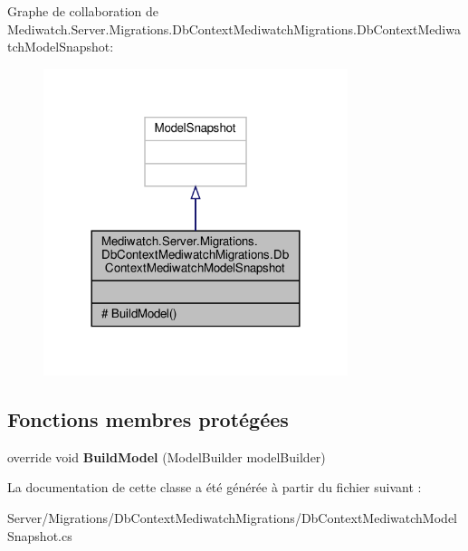 Graphe de collaboration de Mediwatch.\+Server.\+Migrations.\+Db\+Context\+Mediwatch\+Migrations.\+Db\+Context\+Mediwatch\+Model\+Snapshot\+:\nopagebreak
\begin{figure}[H]
\begin{center}
\leavevmode
\includegraphics[width=252pt]{class_mediwatch_1_1_server_1_1_migrations_1_1_db_context_mediwatch_migrations_1_1_db_context_med877236defc748ac970f0d300226712b8}
\end{center}
\end{figure}
\subsection*{Fonctions membres protégées}
\begin{DoxyCompactItemize}
\item 
\mbox{\label{class_mediwatch_1_1_server_1_1_migrations_1_1_db_context_mediwatch_migrations_1_1_db_context_mediwatch_model_snapshot_a8cd3af8a526962ffea2f87f15691a207}} 
override void {\bfseries Build\+Model} (Model\+Builder model\+Builder)
\end{DoxyCompactItemize}


La documentation de cette classe a été générée à partir du fichier suivant \+:\begin{DoxyCompactItemize}
\item 
Server/\+Migrations/\+Db\+Context\+Mediwatch\+Migrations/Db\+Context\+Mediwatch\+Model\+Snapshot.\+cs\end{DoxyCompactItemize}
